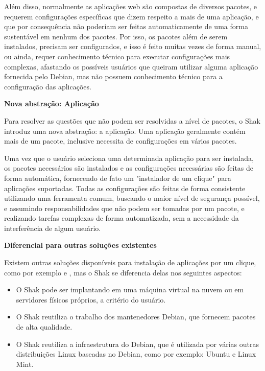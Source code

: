 Além disso, normalmente as aplicações web são compostas de diversos pacotes, e
requerem configurações  específicas que dizem respeito a mais de uma aplicação,
e que por consequência não poderiam ser feitas automaticamente de uma forma sustentável em nenhum dos pacotes. Por isso, os pacotes além de serem instalados, precisam ser configurados,
e isso é feito muitas vezes de forma manual, ou ainda, requer conhecimento técnico
para executar configurações mais complexas, afastando os possíveis usuários
que queiram utilizar alguma aplicação fornecida pelo Debian, mas não possuem
conhecimento técnico para a configuração das aplicações.

\textbf{Nova abstração: Aplicação}

Para resolver as questões que não podem ser resolvidas a nível de pacotes, o
Shak introduz uma nova abstração: a aplicação. Uma aplicação geralmente
contém mais de um pacote, inclusive necessita de configurações em vários pacotes.

Uma vez que o usuário seleciona uma determinada aplicação para
ser instalada, os pacotes necessários são instalados e as configurações
necessárias são feitas de forma automática, fornecendo de fato um "instalador
de um clique" para aplicações suportadas. Todas as configurações são feitas de
forma consistente utilizando uma ferramenta comum, buscando o maior nível de
segurança possível, e assumindo responsabilidades que não podem ser tomadas por
um pacote, e realizando tarefas complexas de forma automatizada, sem a necessidade
da interferência de algum usuário.

\textbf{Diferencial para outras soluções existentes}

Existem outras soluções disponíveis para instalação de aplicações por um clique, 
como por exemplo \cite{bitnami} e \cite{sandstormio}, mas o Shak se
diferencia delas nos seguintes aspectos:

\begin{itemize}
  \item O Shak pode ser implantando em uma máquina virtual na nuvem ou em servidores físicos
    próprios, a critério do usuário.

  \item O Shak reutiliza o trabalho dos mantenedores Debian, que fornecem pacotes
    de alta qualidade.

  \item O Shak reutiliza a infraestrutura do Debian, que é utilizada por várias
outras distribuições Linux baseadas no Debian, como por exemplo: Ubuntu e Linux Mint.

\end{itemize}

